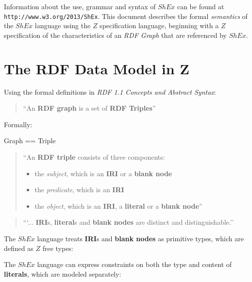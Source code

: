 \documentclass[fuzz]{llncs}
\begin{document}
Information about the use, grammar and syntax of $ShEx$ can be found at \verb#http://www.w3.org/2013/ShEx#. This document describes the formal \textit{semantics} of the $ShEx$ language using the $Z$ specification language, beginning with a $Z$ specification of the characteristics of an \textit{RDF Graph} that are referenced by $ShEx$.

\section{The RDF Data Model in Z}
Using the formal definitions in \textit{RDF 1.1 Concepts and Abstract Syntax}\cite{RDF11}:
\begin{quote}``An \textbf{RDF graph} is a set of \textbf{RDF Triples}''\end{quote}
Formally:
\begin{zed}
Graph == \power Triple
\end{zed}
\begin{quote}``An \textbf{RDF triple} consists of three components:
\begin{itemize}
\item the \textit{subject}, which is an \textbf{IRI} or a \textbf{blank node}
\item the \textit{predicate}, which is an \textbf{IRI}
\item the \textit{object}, which is an \textbf{IRI}, a \textbf{literal} or a \textbf{blank node}''
\end{itemize}
\end{quote}
\begin{quote}
```... \textbf{IRI}s, \textbf{literal}s and \textbf{blank nodes} are distinct and distinguishable.''
\end{quote} 

The $ShEx$ language treats \textbf{IRI}s and \textbf{blank nodes} as primitive types, which are defined as $Z$ free types:
\begin{zed}
\end{zed}

The $ShEx$ language can express constraints on both the type and content of \textbf{literals}, which are modeled separately:
\end{document}
